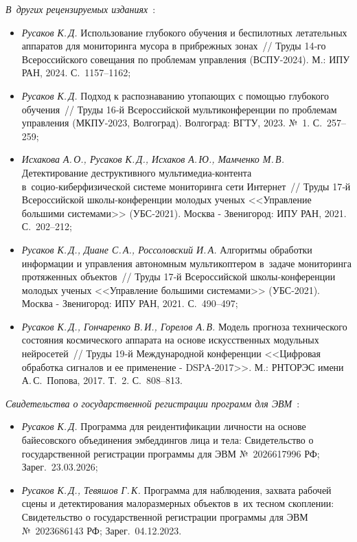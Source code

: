 \emph{В~других рецензируемых
изданиях}~\cite{Rusakov2024marine,Rusakov2023drowning,Iskhakova2021destructive,Rusakov2021multicopter,Rusakov2017spacecraft}:
\begin{itemize}
    \item \emph{Русаков К.\,Д.} Использование глубокого обучения и
    беспилотных летательных аппаратов для мониторинга мусора в
    прибрежных зонах~// Труды 14‑го Всероссийского совещания по
    проблемам управления (ВСПУ‑2024). М.: ИПУ РАН, 2024.
    С.~1157--1162;

    \item \emph{Русаков К.\,Д.} Подход к распознаванию утопающих с
    помощью глубокого обучения~// Труды 16‑й Всероссийской
    мультиконференции по проблемам управления (МКПУ‑2023, Волгоград).
    Волгоград: ВГТУ, 2023. №~1. С.~257--259;

    \item \emph{Исхакова А.\,О., Русаков К.\,Д., Исхаков А.\,Ю.,
    Мамченко М.\,В.} Детектирование деструктивного мультимедиа‑контента
    в~социо‑киберфизической системе мониторинга сети Интернет~// Труды
    17‑й Всероссийской школы‑конференции молодых ученых
    <<Управление большими системами>> (УБС‑2021).
    Москва - Звенигород: ИПУ РАН, 2021. С.~202--212;

    \item \emph{Русаков К.\,Д., Диане С.\,А., Россоловский И.\,А.}
    Алгоритмы обработки информации и управления автономным
    мультикоптером в~задаче мониторинга протяженных объектов~// Труды
    17‑й Всероссийской школы‑конференции молодых ученых
    <<Управление большими системами>> (УБС‑2021).
    Москва - Звенигород: ИПУ РАН, 2021. С.~490--497;

    \item \emph{Русаков К.\,Д., Гончаренко В.\,И., Горелов А.\,В.}
    Модель прогноза технического состояния космического аппарата на
    основе искусственных модульных нейросетей~// Труды 19‑й
    Международной конференции <<Цифровая обработка сигналов и ее
    применение - DSPA‑2017>>. М.: РНТОРЭС имени А.\,С.~Попова, 2017.
    Т.~2. С.~808--813.
\end{itemize}

\emph{Свидетельства о государственной регистрации программ для
ЭВМ}~\cite{prog_reid_bayes,prog_detect_small}:
\begin{itemize}
    \item \emph{Русаков К.\,Д.} Программа для реидентификации личности
    на основе байесовского объединения эмбеддингов лица и тела:
    Свидетельство о государственной регистрации программы для ЭВМ
    №~2026617996 РФ; Зарег.~23.03.2026;

    \item \emph{Русаков К.\,Д., Тевяшов Г.\,К.} Программа для
    наблюдения, захвата рабочей сцены и детектирования малоразмерных
    объектов в~их тесном скоплении: Свидетельство о государственной
    регистрации программы для ЭВМ №~2023686143 РФ; Зарег.~04.12.2023.
\end{itemize}

